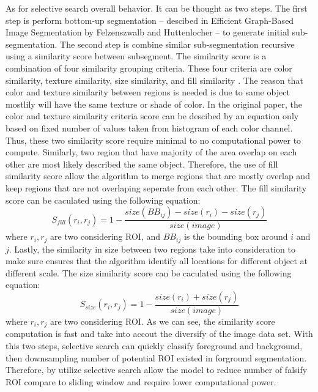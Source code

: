 As for selective search overall behavior. It can be thought as two steps. The first step is perform bottom-up segmentation -- descibed in Efficient Graph-Based Image Segmentation by Felzenszwalb and Huttenlocher \cite{felzenszwalb_huttenlocher_2004} -- to generate initial sub-segmentation. The second step is combine similar sub-segmentation recursive using a similarity score between subsegment. The similarity score is a combination of four similarity grouping criteria. These four criteria are color similarity, texture similarity, size similarity, and fill similarity \cite{uijlings_selective_search_2013}. The reason that color and texture similarity between regions is needed is due to same object mostlily will have the same texture or shade of color. In the original paper, the color and texture similarity criteria score can be descibed by an equation only based on fixed number of values taken from histogram of each color channel. Thus, these two similarity score require minimal to no computational power to compute. Similarly, two region that have majority of the area overlap on each other are most likely described the same object. Therefore, the use of fill similarity score allow the algorithm to merge regions that are mostly overlap and keep regions that are not overlaping seperate from each other. The fill similarity score can be caculated using the following equation: 
%
\begin{equation*}
    S_{fill}(r_i, r_j) = 1-\frac{size(BB_{ij})-size(r_i)-size(r_j)}{size(image)}
\end{equation*}
%
where $r_i, r_j$ are two considering ROI, and $BB_{ij}$ is the bounding box around $i$ and $j$. Lastly, the similarity in size between two regions take into consideration to make sure ensures that the algorithm identify all locations for different object at different scale. The size similarity score can be caculated using the following equation: 
%
\begin{equation*}
    S_{size}(r_i, r_j) = 1-\frac{size(r_i)+size(r_j)}{size(image)}
\end{equation*}
%
where $r_i, r_j$ are two considering ROI. As we can see, the similarity score computation is fast and take into accout the diversify of the image data set. With this two steps, selective search can quickly classify foreground and background, then downsampling number of potential ROI existed in forground segmentation. Therefore, by utilize selective search allow the model to reduce number of falsify ROI compare to sliding window and require lower computational power.


